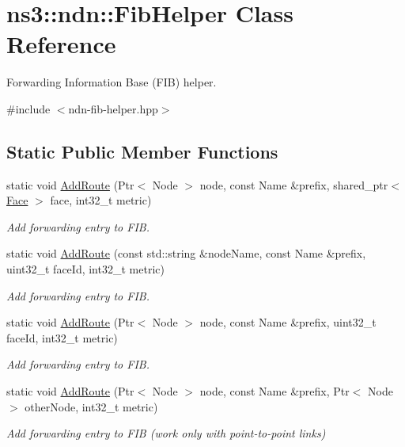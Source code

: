\hypertarget{classns3_1_1ndn_1_1FibHelper}{}\section{ns3\+:\+:ndn\+:\+:Fib\+Helper Class Reference}
\label{classns3_1_1ndn_1_1FibHelper}


Forwarding Information Base (F\+IB) helper.  




{\ttfamily \#include $<$ndn-\/fib-\/helper.\+hpp$>$}

\subsection*{Static Public Member Functions}
\begin{DoxyCompactItemize}
\item 
static void \hyperlink{classns3_1_1ndn_1_1FibHelper_a778df0d68eafc7dd3898aff9adae5a00}{Add\+Route} (Ptr$<$ Node $>$ node, const Name \&prefix, shared\+\_\+ptr$<$ \hyperlink{classnfd_1_1Face}{Face} $>$ face, int32\+\_\+t metric)
\begin{DoxyCompactList}\small\item\em Add forwarding entry to F\+IB. \end{DoxyCompactList}\item 
static void \hyperlink{classns3_1_1ndn_1_1FibHelper_a66aa7e4ada91b433f13bbe75d05a2b9e}{Add\+Route} (const std\+::string \&node\+Name, const Name \&prefix, uint32\+\_\+t face\+Id, int32\+\_\+t metric)
\begin{DoxyCompactList}\small\item\em Add forwarding entry to F\+IB. \end{DoxyCompactList}\item 
static void \hyperlink{classns3_1_1ndn_1_1FibHelper_a09cfa453277b8d3e8dc35aa065da2a2b}{Add\+Route} (Ptr$<$ Node $>$ node, const Name \&prefix, uint32\+\_\+t face\+Id, int32\+\_\+t metric)
\begin{DoxyCompactList}\small\item\em Add forwarding entry to F\+IB. \end{DoxyCompactList}\item 
static void \hyperlink{classns3_1_1ndn_1_1FibHelper_ac85c33de983ec1e787e627ef7bf8e0e8}{Add\+Route} (Ptr$<$ Node $>$ node, const Name \&prefix, Ptr$<$ Node $>$ other\+Node, int32\+\_\+t metric)
\begin{DoxyCompactList}\small\item\em Add forwarding entry to F\+IB (work only with point-\/to-\/point links) \end{DoxyCompactList}\item 

\end{DoxyCompactItemize}

